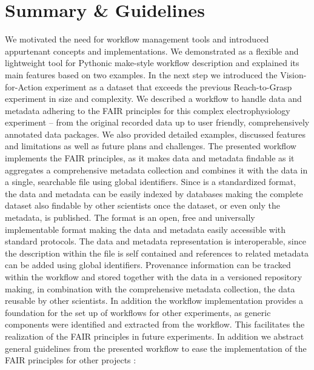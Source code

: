 \section{Summary \& Guidelines}
\label{sec:guidelines}
We motivated the need for workflow management tools and introduced appurtenant concepts and implementations. We demonstrated  as a flexible and lightweight tool for Pythonic make-style workflow description and explained its main features based on two examples. In the next step we introduced the Vision-for-Action experiment as a dataset that exceeds the previous Reach-to-Grasp experiment in size and complexity. We described a workflow to handle data and metadata adhering to the FAIR principles for this complex electrophysiology experiment -- from the original recorded data up to user friendly, comprehensively annotated data packages. We also provided detailed examples, discussed features and limitations as well as future plans and challenges.
The presented workflow implements the FAIR principles, as it makes data and metadata findable as it aggregates a comprehensive metadata collection and combines it with the data in a single, searchable  file using global identifiers. Since   is a standardized format, the data and metadata can be easily indexed by databases making the complete dataset also findable by other scientists once the dataset, or even only the metadata, is published.
The  format is an open, free and universally implementable format making the data and metadata easily accessible with standard protocols. The data and metadata representation is interoperable, since the description within the  file is self contained and references to related metadata can be added using global identifiers.
Provenance information can be tracked within the workflow and stored together with the data in a versioned repository making, in combination with the comprehensive metadata collection, the data reusable by other scientists.
In addition the workflow implementation provides a foundation for the set up of workflows for other experiments, as generic components were identified and extracted from the workflow. This facilitates the realization of the FAIR principles in future experiments. In addition we abstract general guidelines from the presented workflow to ease the implementation of the FAIR principles for other projects :

